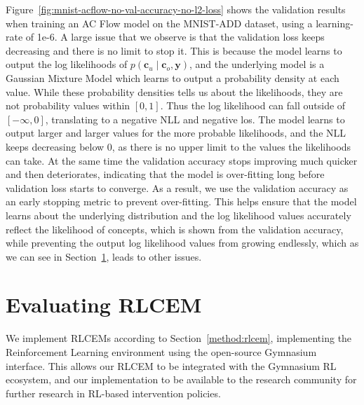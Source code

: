 Figure~\ref{fig:mnist-acflow-no-val-accuracy-no-l2-loss} shows the 
validation results when training an AC Flow model
on the MNIST-ADD dataset, using a learning-rate of 1e-6.
A large issue that we observe is that the validation loss
keeps decreasing and there is no limit to stop it.
This is because the model learns to output the log likelihoods 
of $p(\mathbf{c}_u \mid \mathbf{c}_o, \mathbf{y})$, and the underlying
model is a Gaussian Mixture Model which learns to output
a probability density at each value. While these probability densities
tells us about the likelihoods,
they are not probability values within $[0,1]$. 
Thus the log likelihood can fall outside of $[-\infty, 0]$,
translating to a negative NLL and negative los.
The model learns to output larger and larger
values for the more probable likelihoods, and the NLL keeps decreasing
below 0, as there is no upper limit to the values the likelihoods can take.
 At the same time the validation accuracy stops improving
 much quicker and then deteriorates, indicating that the model is over-fitting
long before validation loss starts to converge.
As a result, we use the validation accuracy as an early stopping
metric to prevent over-fitting. This helps ensure that 
the model learns about the underlying distribution and 
the log likelihood values accurately reflect the likelihood 
of concepts, which is 
shown from the validation accuracy, while preventing 
the output log likelihood values from growing endlessly, which
as we can see in Section~\ref{eval:rlcem-performance}, 
leads to other issues.

\section{Evaluating RLCEM}\label{eval:rlcem-performance}

We implement RLCEMs according to Section~\ref{method:rlcem},
implementing the Reinforcement Learning environment using the 
open-source
Gymnasium~\cite{gymnasium} interface. This allows our RLCEM to be integrated
 with the Gymnasium RL ecosystem, and our implementation
to be available to the research community for further research in 
RL-based intervention policies.

